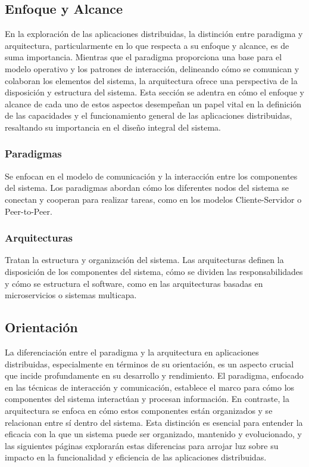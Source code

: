 \subsection{Enfoque y Alcance}
En la exploración de las aplicaciones distribuidas, la distinción entre paradigma y arquitectura, particularmente en lo que respecta a su enfoque y alcance, es de suma importancia. Mientras que el paradigma proporciona una base para el modelo operativo y los patrones de interacción, delineando cómo se comunican y colaboran los elementos del sistema, la arquitectura ofrece una perspectiva de la disposición y estructura del sistema. Esta sección se adentra en cómo el enfoque y alcance de cada uno de estos aspectos desempeñan un papel vital en la definición de las capacidades y el funcionamiento general de las aplicaciones distribuidas, resaltando su importancia en el diseño integral del sistema.

\subsubsection{Paradigmas}
Se enfocan en el modelo de comunicación y la interacción entre los componentes del sistema. Los paradigmas abordan cómo los diferentes nodos del sistema se conectan y cooperan para realizar tareas, como en los modelos Cliente-Servidor o Peer-to-Peer.

\subsubsection{Arquitecturas}
Tratan la estructura y organización del sistema. Las arquitecturas definen la disposición de los componentes del sistema, cómo se dividen las responsabilidades y cómo se estructura el software, como en las arquitecturas basadas en microservicios o sistemas multicapa.

\subsection{Orientación}
La diferenciación entre el paradigma y la arquitectura en aplicaciones distribuidas, especialmente en términos de su orientación, es un aspecto crucial que incide profundamente en su desarrollo y rendimiento. El paradigma, enfocado en las técnicas de interacción y comunicación, establece el marco para cómo los componentes del sistema interactúan y procesan información. En contraste, la arquitectura se enfoca en cómo estos componentes están organizados y se relacionan entre sí dentro del sistema. Esta distinción es esencial para entender la eficacia con la que un sistema puede ser organizado, mantenido y evolucionado, y las siguientes páginas explorarán estas diferencias para arrojar luz sobre su impacto en la funcionalidad y eficiencia de las aplicaciones distribuidas.

